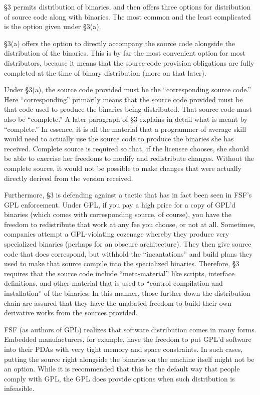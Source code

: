 \documentclass[11pt, letterpaper]{book}
\begin{document}
\S 3 permits distribution of binaries, and then offers three options for
distribution of source code along with binaries. The most common and the
least complicated is the option given under \S 3(a).

\S 3(a) offers the option to directly accompany the source code alongside
the distribution of the binaries. This is by far the most convenient
option for most distributors, because it means that the source-code
provision obligations are fully completed at the time of binary
distribution (more on that later).

Under \S 3(a), the source code provided must be the ``corresponding source
code.''  Here ``corresponding'' primarily means that the source code
provided must be that code used to produce the binaries being distributed.
That source code must also be ``complete.''  A later paragraph of \S 3
explains in detail what is meant by ``complete.''  In essence, it is all
the material that a programmer of average skill would need to actually use
the source code to produce the binaries she has received. Complete source
is required so that, if the licensee chooses, she should be able to
exercise her freedoms to modify and redistribute changes. Without the
complete source, it would not be possible to make changes that were
actually directly derived from the version received.

Furthermore, \S 3 is defending against a tactic that has in fact been
seen in FSF's GPL enforcement. Under GPL, if you pay a high price for
a copy of GPL'd binaries (which comes with corresponding source, of
course), you have the freedom to redistribute that work at any fee you
choose, or not at all. Sometimes, companies attempt a GPL-violating
cozenage whereby they produce very specialized binaries (perhaps for
an obscure architecture). They then give source code that does
correspond, but withhold the ``incantations'' and build plans they
used to make that source compile into the specialized binaries.
Therefore, \S 3 requires that the source code include ``meta-material'' like
scripts, interface definitions, and other material that is used to
``control compilation and installation'' of the binaries. In this
manner, those further down the distribution chain are assured that
they have the unabated freedom to build their own derivative works
from the sources provided.

FSF (as authors of GPL) realizes that software distribution comes in many
forms. Embedded manufacturers, for example, have the freedom to put
GPL'd software into their PDAs with very tight memory and space
constraints. In such cases, putting the source right alongside the
binaries on the machine itself might not be an option. While it is
recommended that this be the default way that people comply with GPL, the
GPL does provide options when such distribution is infeasible.
\end{document}
